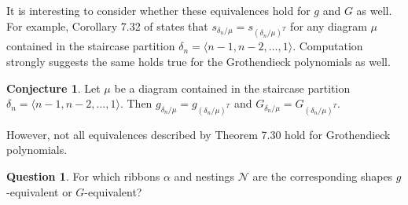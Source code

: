 \documentclass[12pt]{amsart}
\theoremstyle{definition}
\newtheorem{conjecture}[thm]{Conjecture}
\newtheorem{question}[thm]{Question}
\begin{document}
It is interesting to consider whether these equivalences hold for $g$ and $G$ as well. For example, Corollary 7.32 of \cite{rsw2009coincidences} states that $s_{\delta_n/\mu} = s_{(\delta_n/\mu)^T}$ for any diagram $\mu$ contained in the staircase partition $\delta_n = \langle n-1,n-2,\ldots,1\rangle $. Computation strongly suggests the same holds true for the Grothendieck polynomials as well.

\begin{conjecture}\label{stair_pair}
Let $\mu$ be a diagram contained in the staircase partition $\delta_n = \langle n-1,n-2,\ldots,1 \rangle$. Then $g_{\delta_n/\mu} = g_{(\delta_n/\mu)^T}$ and $G_{\delta_n/\mu} = G_{(\delta_n/\mu)^T}$.
\end{conjecture}

However, not all equivalences described by Theorem 7.30 hold for Grothendieck polynomials. 

\begin{question}
For which ribbons $\alpha$ and nestings $\mathcal{N}$ are the corresponding shapes $g$-equivalent or $G$-equivalent?
\end{question}
\end{document}
